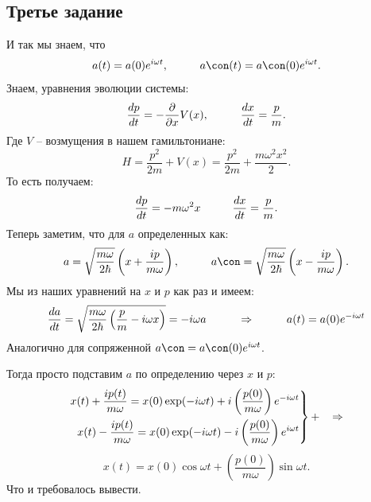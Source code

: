 \subsection*{Третье задание}
И так мы знаем, что 
\begin{equation*}
	a(t) = a(0) e^{i \omega t},
	\hspace{1 cm}
	a\con(t) = a\con(0) e^{i \omega t}.
\end{equation*}
Знаем, уравнения эволюции системы:
\begin{equation*}
	\frac{d p }{d t} = - \frac{\partial}{\partial x} V(x),
	\hspace{1 cm}
	 \frac{d x}{d t} = \frac{p}{m}.
\end{equation*}
Где $V$ -- возмущения в нашем гамильтониане:
\begin{equation*}
	H = \frac{p^2}{2 m} + V(x) = \frac{p^2}{2 m} + \frac{m \omega^2 x^2}{2}.
\end{equation*}
То есть получаем:
\begin{equation*}
	\frac{d p }{d t} = - m \omega^2 x
	\hspace{1 cm}
	\frac{d x}{d t} = \frac{p}{m}.
\end{equation*}
Теперь заметим, что для $a$ определенных как:
\begin{equation*}
	a = \sqrt{\frac{m \omega}{2 \hbar}} \left(x + \frac{i p }{m \omega}\right),
	\hspace{1 cm}
	a\con = \sqrt{\frac{m \omega}{2 \hbar}} \left(x - \frac{i p }{m \omega}\right).
\end{equation*}
Мы из наших уравнений на $x$ и $p$ как раз и имеем:
\begin{equation*}
	\frac{d a}{d t} = \sqrt{\frac{m \omega}{2 \hbar}\left(\frac{p}{m} - i \omega x\right)} = - i \omega a
	\hspace{1 cm}
	\Rightarrow
	\hspace{1 cm}
	a(t) = a(0) e^{- i \omega t}
\end{equation*}
Аналогично для сопряженной $a\con = a\con(0) e^{i \omega t}$.

Тогда просто подставим $a$ по определению через $x$ и $p$:
\begin{equation*}
	\left.
	\begin{aligned}
		x(t) + \frac{i p (t)}{m \omega} = x(0) \exp(-i\omega t) + i \left(\frac{p(0)}{m \omega}\right) e^{- i \omega t}\\
		x(t) - \frac{i p (t)}{m \omega} = x(0) \exp(-i\omega t) - i \left(\frac{p(0)}{m \omega}\right) e^{i \omega t}
	\end{aligned}
	\right\}
	+
	\hspace{0.3 cm}
	\Rightarrow
\end{equation*}
\begin{equation*}
	x(t) = x(0) \cos \omega t + \left(\frac{p(0)}{m \omega}\right) \sin \omega t.
\end{equation*}
Что и требовалось вывести.